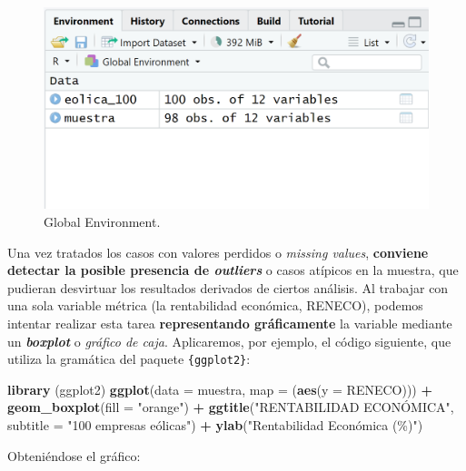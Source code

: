 \documentclass[
]{book}
\newenvironment{Shaded}{\begin{snugshade}}{\end{snugshade}}
\newcommand{\AttributeTok}[1]{\textcolor[rgb]{0.13,0.29,0.53}{#1}}
\newcommand{\FunctionTok}[1]{\textcolor[rgb]{0.13,0.29,0.53}{\textbf{#1}}}
\newcommand{\NormalTok}[1]{#1}
\newcommand{\SpecialCharTok}[1]{\textcolor[rgb]{0.81,0.36,0.00}{\textbf{#1}}}
\newcommand{\StringTok}[1]{\textcolor[rgb]{0.31,0.60,0.02}{#1}}
\let\Oldincludegraphics\includegraphics
\renewcommand{\includegraphics}[2][]{%
  \Oldincludegraphics[#1]{#2}%
}
\begin{document}
\begin{figure}
\centering
\includegraphics[width=5.20833in,height=\textheight]{figuras/Imagen4_01.png}
\caption{Global Environment.}
\end{figure}

Una vez tratados los casos con valores perdidos o \emph{missing values}, \textbf{conviene detectar la posible presencia de \emph{outliers}} o casos atípicos en la muestra, que pudieran desvirtuar los resultados derivados de ciertos análisis. Al trabajar con una sola variable métrica (la rentabilidad económica, RENECO), podemos intentar realizar esta tarea \textbf{representando gráficamente} la variable mediante un \textbf{\emph{boxplot}} o \emph{gráfico de caja}. Aplicaremos, por ejemplo, el código siguiente, que utiliza la gramática del paquete \texttt{\{ggplot2\}}:

\begin{Shaded}
\begin{Highlighting}[]
\FunctionTok{library}\NormalTok{ (ggplot2)}
\FunctionTok{ggplot}\NormalTok{(}\AttributeTok{data =}\NormalTok{ muestra, }\AttributeTok{map =}\NormalTok{ (}\FunctionTok{aes}\NormalTok{(}\AttributeTok{y =}\NormalTok{ RENECO))) }\SpecialCharTok{+}
    \FunctionTok{geom\_boxplot}\NormalTok{(}\AttributeTok{fill =} \StringTok{"orange"}\NormalTok{) }\SpecialCharTok{+}
    \FunctionTok{ggtitle}\NormalTok{(}\StringTok{"RENTABILIDAD ECONÓMICA"}\NormalTok{, }\AttributeTok{subtitle =} \StringTok{"100 empresas eólicas"}\NormalTok{) }\SpecialCharTok{+}
    \FunctionTok{ylab}\NormalTok{(}\StringTok{"Rentabilidad Económica (\%)"}\NormalTok{)}
\end{Highlighting}
\end{Shaded}

Obteniéndose el gráfico:
\end{document}
